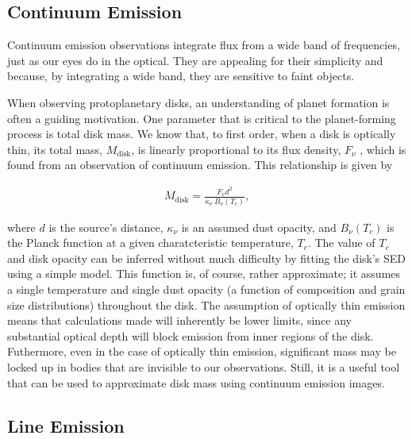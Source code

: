 \subsection{Continuum Emission}
\label{section:continuum_emission}

Continuum emission observations integrate flux from a wide band of frequencies, just as our eyes do in the optical. They are appealing for their simplicity and because, by integrating a wide band, they are sensitive to faint objects.

When observing protoplanetary disks, an understanding of planet formation is often a guiding motivation. One parameter that is critical to the planet-forming process is total disk mass. We know that, to first order, when a disk is optically thin, its total mass, $M_{\text{disk}}$, is linearly proportional to its flux density, $F_{\nu}$ \citep{Hildebrand1983}, which is found from an observation of continuum emission. This relationship is given by

\begin{align}
M_{\text{disk}} = \frac{F_{\nu} d^2}{\kappa_{\nu}\ B_{\nu}(T_c)},
\end{align}

where $d$ is the source's distance, $\kappa_{\nu}$ is an assumed dust opacity, and $B_{\nu}(T_c)$ is the Planck function at a given charatcteristic temperature, $T_c$. The value of $T_c$ and disk opacity can be inferred without much difficulty by fitting the disk's SED using a simple model. This function is, of course, rather approximate; it assumes a single temperature and single dust opacity (a function of composition and grain size distributions) throughout the disk. The assumption of optically thin emission means that calculations made will inherently be lower limits, since any substantial optical depth will block emission from inner regions of the disk. Futhermore, even in the case of optically thin emission, significant mass may be locked up in bodies that are invisible to our observations. Still, it is a useful tool that can be used to approximate disk mass using continuum emission images.


\subsection{Line Emission}

